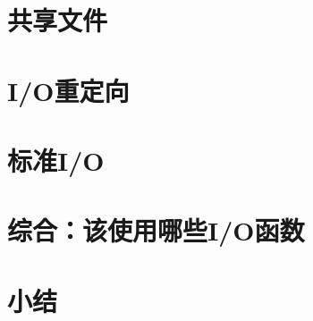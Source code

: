 \pending

\section{共享文件}

\pending

\section{I/O重定向}

\pending

\section{标准I/O}

\pending

\section{综合：该使用哪些I/O函数}

\pending

\section{小结}

\pending
